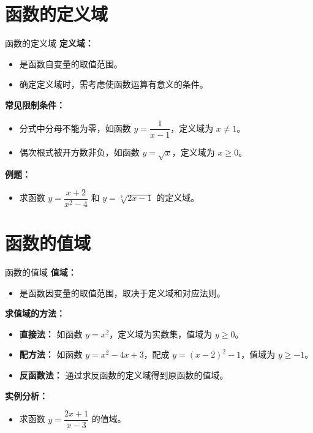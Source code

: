 \documentclass[aspectratio=169]{ctexbeamer} %
\begin{document}
\section{函数的定义域}
\begin{frame}{函数的定义域}
    \textbf{定义域：}
    \begin{itemize}
        \item 是函数自变量的取值范围。
        \item 确定定义域时，需考虑使函数运算有意义的条件。
    \end{itemize}

    \vspace{0.5cm}
    \textbf{常见限制条件：}
    \begin{itemize}
        \item 分式中分母不能为零，如函数 \( y = \dfrac{1}{x - 1} \)，定义域为 \( x \neq 1 \)。
        \item 偶次根式被开方数非负，如函数 \( y = \sqrt{x} \)，定义域为 \( x \geq 0 \)。
    \end{itemize}

    \vspace{0.5cm}
    \textbf{例题：}
    \begin{itemize}
        \item 求函数 \( y = \dfrac{x + 2}{x^2 - 4} \) 和 \( y = \sqrt[3]{2x - 1} \) 的定义域。
    \end{itemize}
\end{frame}

\section{函数的值域}

\begin{frame}{函数的值域}
    \textbf{值域：}
    \begin{itemize}
        \item 是函数因变量的取值范围，取决于定义域和对应法则。
    \end{itemize}

    \vspace{0.5cm}
    \textbf{求值域的方法：}
    \begin{itemize}
        \item \textbf{直接法：} 如函数 \( y = x^2 \)，定义域为实数集，值域为 \( y \geq 0 \)。
        \item \textbf{配方法：} 如函数 \( y = x^2 - 4x + 3 \)，配成 \( y = (x - 2)^2 - 1 \)，值域为 \( y \geq -1 \)。
        \item \textbf{反函数法：} 通过求反函数的定义域得到原函数的值域。
    \end{itemize}

    \vspace{0.5cm}
    \textbf{实例分析：}
    \begin{itemize}
        \item 求函数 \( y = \dfrac{2x + 1}{x - 3} \) 的值域。
    \end{itemize}
\end{frame}
\end{document}
